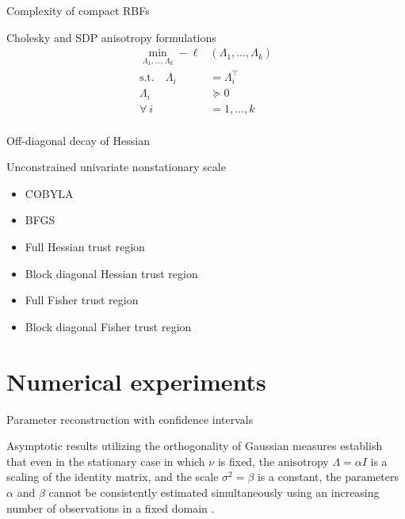 \documentclass{article}
\numberwithin{equation}{section}
\begin{document}
Complexity of compact RBFs

Cholesky and SDP anisotropy formulations
\begin{align*}
  \min_{\Lambda_1, ..., \Lambda_k}  -\ell&(\Lambda_1, ..., \Lambda_k) \\
  \text{s.t.} \quad \Lambda_i & = \Lambda_i^\top \\
  \Lambda_i & \succeq 0 \quad \\
  \forall \ i & = 1,...,k \\
\end{align*}

Off-diagonal decay of Hessian

Unconstrained univariate nonstationary scale
\begin{itemize}
  \item COBYLA
  \item BFGS
  \item Full Hessian trust region
  \item Block diagonal Hessian trust region
  \item Full Fisher trust region
  \item Block diagonal Fisher trust region
\end{itemize}

\section{Numerical experiments} \label{experiments}
Parameter reconstruction with confidence intervals

Asymptotic results utilizing the orthogonality of Gaussian measures establish that even in the stationary case in which $\nu$ is fixed, the anisotropy $\Lambda = \alpha I$ is a scaling of the identity matrix, and the scale $\sigma^2 = \beta$ is a constant, the parameters $\alpha$ and $\beta$ cannot be consistently estimated simultaneously using an increasing number of observations in a fixed domain \cite{zhang2004inconsistent}.
\end{document}
